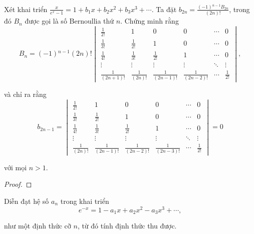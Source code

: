 \documentclass[class=linearalgebra,crop=false]{standalone}
\begin{document}
\begin{exercise}
    \par Xét khai triển $\frac{x}{e^{x} - 1} = 1 + b_{1}x + b_{2}x^{2} + b_{3}x^{3} + \cdots$. Ta đặt $b_{2n} = \frac{(-1){}^{n-1}B_{2n}}{(2n)!}$, trong đó $B_{n}$ được gọi là số Bernoullia thứ $n$. Chứng minh rằng
    \[
        B_{n} = (-1){}^{n-1}(2n)!
        \begin{vmatrix}
            \frac{1}{2!}      & 1               & 0                 & 0                 & \cdots & 0            \\
            \frac{1}{3!}      & \frac{1}{2!}    & 1                 & 0                 & \cdots & 0            \\
            \frac{1}{4!}      & \frac{1}{3!}    & \frac{1}{2!}      & 1                 & \cdots & 0            \\
            \vdots            & \vdots          & \vdots            & \vdots            & \ddots & \vdots       \\
            \frac{1}{(2n+1)!} & \frac{1}{(2n)!} & \frac{1}{(2n-1)!} & \frac{1}{(2n-2)!} & \cdots & \frac{1}{2!}
        \end{vmatrix},
    \]
    \par và chỉ ra rằng
    \[
        b_{2n-1} =
        \begin{vmatrix}
            \frac{1}{2!}    & 1                 & 0                 & 0                 & \cdots & 0            \\
            \frac{1}{3!}    & \frac{1}{2!}      & 1                 & 0                 & \cdots & 0            \\
            \frac{1}{4!}    & \frac{1}{3!}      & \frac{1}{2!}      & 1                 & \cdots & 0            \\
            \vdots          & \vdots            & \vdots            & \vdots            & \ddots & \vdots       \\
            \frac{1}{(2n)!} & \frac{1}{(2n-1)!} & \frac{1}{(2n-2)!} & \frac{1}{(2n-3)!} & \cdots & \frac{1}{2!}
        \end{vmatrix}
        = 0
    \]
    \par với mọi $n > 1$.
\end{exercise}

\begin{proof}
\end{proof}

\begin{exercise}
    \par Diễn đạt hệ số $a_{n}$ trong khai triển
    \[
        e^{-x} = 1 - a_{1}x + a_{2}x^{2} - a_{3}x^{3} + \cdots ,
    \]
    \par như một định thức cỡ $n$, từ đó tính định thức thu được.
\end{exercise}
\end{document}
